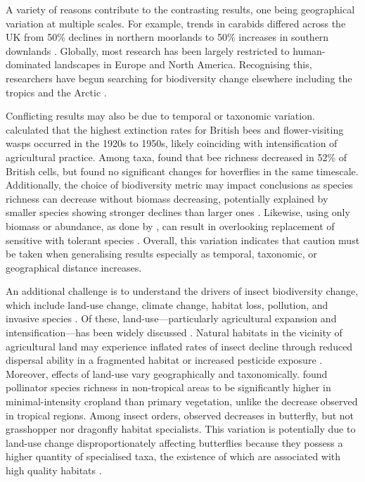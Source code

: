 \documentclass[11pt]{article}
\begin{document}
		\noindent A variety of reasons contribute to the contrasting results, one being geographical variation at multiple scales. For example, trends in carabids differed across the UK from 50\% declines in northern moorlands to 50\% increases in southern downlands \citep{brooks2012large}. Globally, most research has been largely restricted to human-dominated landscapes in Europe and North America. Recognising this, researchers have begun searching for biodiversity change elsewhere including the tropics \citep{lister2018climate,wagner2021insect} and the Arctic \citep{loboda2018declining,gillespie2020status}.    
		
		\noindent Conflicting results may also be due to temporal or taxonomic variation. \citet{ollerton2014extinctions} calculated that the highest extinction rates for British bees and flower-visiting wasps occurred in the 1920s to 1950s, likely coinciding with intensification of agricultural practice. Among taxa, \citet{biesmeijer2006parallel} found that bee richness decreased in 52\% of British cells, but found no significant changes for hoverflies in the same timescale. Additionally, the choice of biodiversity metric may impact conclusions as species richness can decrease without biomass decreasing, potentially explained by smaller species showing stronger declines than larger ones \citep{homburg2019have}. Likewise, using only biomass or abundance, as done by \citet{van2020meta}, can result in overlooking replacement of sensitive with tolerant species \citep{jahnig2021revisiting}. Overall, this variation indicates that caution must be taken when generalising results especially as temporal, taxonomic, or geographical distance increases.   
		
		\noindent An additional challenge is to understand the drivers of insect biodiversity change, which include land-use change, climate change, habitat loss, pollution, and invasive species \citep{cardoso2020scientists}. Of these, land-use—particularly agricultural expansion and intensification—has been widely discussed \citep{newbold2014global,newbold2016global,newbold2018widespread,seibold2019arthropod,gillespie2022landscape}. Natural habitats in the vicinity of agricultural land may experience inflated rates of insect decline through reduced dispersal ability in a fragmented habitat or increased pesticide exposure \citep{seibold2019arthropod}. Moreover, effects of land-use vary geographically and taxonomically. \citet{millard2021global} found pollinator species richness in non-tropical areas to be significantly higher in minimal-intensity cropland than primary vegetation, unlike the decrease observed in tropical regions. Among insect orders, \citet{engelhardt2022consistent} observed decreases in butterfly, but not grasshopper nor dragonfly habitat specialists. This variation is potentially due to land-use change disproportionately affecting butterflies because they possess a higher quantity of specialised taxa, the existence of which are associated with high quality habitats \citep{poniatowski2018patch}. 
		
\end{document}
